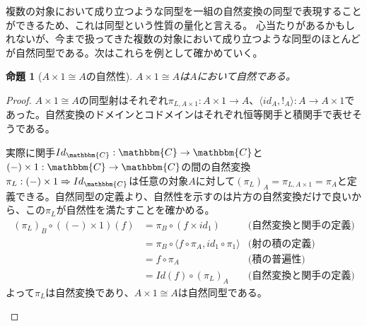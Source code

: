 \documentclass[uplatex,dvipdfmx]{jsarticle}
\newcommand{\cat}[1]{\mathbbm{#1}}
\newcommand{\arrow}{\rightarrow}
\newcommand{\functor}[3]{#1:\cat{#2}\arrow \cat{#3}}
\newcommand{\nat}[3]{#1:#2\Rightarrow #3}
\newcommand{\tuple}[1]{\langle #1\rangle}
\newcommand{\mor}[3]{#1:#2\arrow #3}
\newtheorem{proof}{証明}[section]
\newtheorem{prop}{命題}[section]
\numberwithin{proof}{subsection}
\numberwithin{prop}{subsection}
\numberwithin{define}{subsection}
\begin{document}
  複数の対象において成り立つような同型を一組の自然変換の同型で表現することができるため、これは同型という性質の量化と言える。
  心当たりがあるかもしれないが、今まで扱ってきた複数の対象において成り立つような同型のほとんどが自然同型である。次はこれらを例として確かめていく。
  \begin{prop}[$A\times 1\cong A$の自然性]
    $A\times 1\cong A$は$A$において自然である。
  \end{prop}
  \begin{proof}
    $A\times 1\cong A$の同型射はそれぞれ$\mor{\pi_{L,A\times 1}}{A\times 1}{A}$、$\mor{\tuple{id_A,!_A}}{A}{A\times 1}$であった。自然変換のドメインとコドメインはそれぞれ恒等関手と積関手で表せそうである。

    実際に関手$\functor{Id_\cat{C}}{C}{C}$と$\functor{(-)\times 1}{C}{C}$の間の自然変換$\nat{\pi_L}{(-)\times 1}{Id_\cat{C}}$は任意の対象$A$に対して$(\pi_L)_A=\pi_{L,A\times 1}=\pi_A$と定義できる。自然同型の定義より、自然性を示すのは片方の自然変換だけで良いから、この$\pi_L$が自然性を満たすことを確かめる。
    \begin{align*}
      (\pi_L)_{B}\circ ((-)\times 1)(f)&=\pi_B\circ(f\times id_1)&\text{(自然変換と関手の定義)}\\
      &=\pi_B\circ\tuple{f\circ\pi_A,id_1\circ\pi_1}&\text{(射の積の定義)}\\
      &=f\circ\pi_A&\text{(積の普遍性)}\\
      &=Id(f)\circ(\pi_L)_A&\text{(自然変換と関手の定義)}
    \end{align*}
    よって$\pi_L$は自然変換であり、$A\times 1\cong A$は自然同型である。
    \begin{center}
    \end{center}

  \end{proof}
\end{document}
